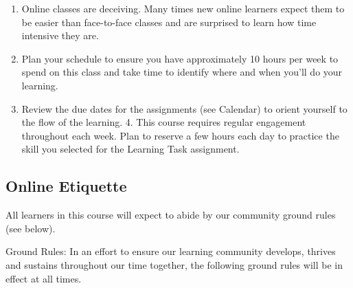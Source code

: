\documentclass[
  letterpaper,
  DIV=11,
  numbers=noendperiod]{scrartcl}
\providecommand{\tightlist}{%
  \setlength{\itemsep}{0pt}\setlength{\parskip}{0pt}}\usepackage{longtable,booktabs,array}
\begin{document}
\begin{enumerate}
\def\labelenumi{\arabic{enumi}.}
\tightlist
\item
  Online classes are deceiving. Many times new online learners expect
  them to be easier than face-to-face classes and are surprised to learn
  how time intensive they are.
\item
  Plan your schedule to ensure you have approximately 10 hours per week
  to spend on this class and take time to identify where and when you'll
  do your learning.
\item
  Review the due dates for the assignments (see Calendar) to orient
  yourself to the flow of the learning. 4. This course requires regular
  engagement throughout each week. Plan to reserve a few hours each day
  to practice the skill you selected for the Learning Task assignment.
\end{enumerate}

\hypertarget{online-etiquette}{%
\subsection{Online Etiquette}\label{online-etiquette}}

All learners in this course will expect to abide by our community ground
rules (see below).

Ground Rules: In an effort to ensure our learning community develops,
thrives and sustains throughout our time together, the following ground
rules will be in effect at all times.
\end{document}
